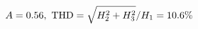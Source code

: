 \documentclass[preview]{standalone}
\begin{document}
\begin{align*}
\special{dvisvgm:raw <g id='unique000'>}A=0.56,\ \text{THD}=\sqrt{H_2^2+H_3^2}/H_1=10.6\%\special{dvisvgm:raw </g>}
\end{align*}
\end{document}
